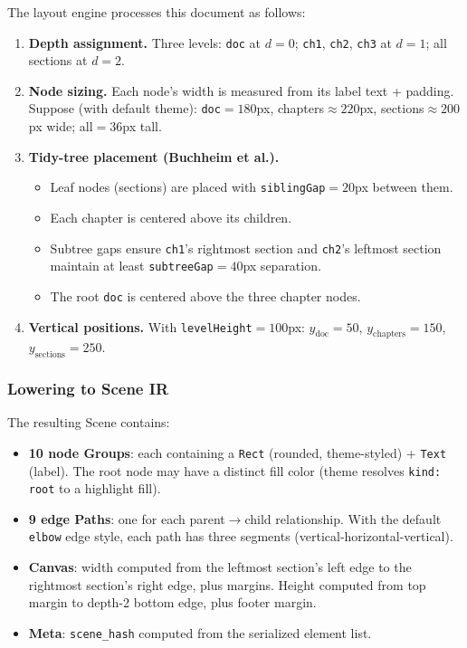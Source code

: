 The layout engine processes this document as follows:

\begin{enumerate}
  \item \textbf{Depth assignment.} Three levels: \texttt{doc} at $d=0$; \texttt{ch1}, \texttt{ch2}, \texttt{ch3} at $d=1$; all sections at $d=2$.
  
  \item \textbf{Node sizing.} Each node's width is measured from its label text + padding. Suppose (with default theme): \texttt{doc}$=180$px, chapters$\approx220$px, sections$\approx200$px wide; all$=36$px tall.
  
  \item \textbf{Tidy-tree placement (Buchheim et al.).}
  \begin{itemize}
    \item Leaf nodes (sections) are placed with \texttt{siblingGap}$=20$px between them.
    \item Each chapter is centered above its children.
    \item Subtree gaps ensure \texttt{ch1}'s rightmost section and \texttt{ch2}'s leftmost section maintain at least \texttt{subtreeGap}$=40$px separation.
    \item The root \texttt{doc} is centered above the three chapter nodes.
  \end{itemize}
  
  \item \textbf{Vertical positions.} With \texttt{levelHeight}$=100$px: $y_{\text{doc}}=50$, $y_{\text{chapters}}=150$, $y_{\text{sections}}=250$.
\end{enumerate}

\subsubsection{Lowering to Scene IR}

The resulting Scene contains:

\begin{itemize}
  \item \textbf{10 node Groups}: each containing a \texttt{Rect} (rounded, theme-styled) + \texttt{Text} (label). The root node may have a distinct fill color (theme resolves \texttt{kind: root} to a highlight fill).
  
  \item \textbf{9 edge Paths}: one for each parent$\rightarrow$child relationship. With the default \texttt{elbow} edge style, each path has three segments (vertical-horizontal-vertical).
  
  \item \textbf{Canvas}: width computed from the leftmost section's left edge to the rightmost section's right edge, plus margins. Height computed from top margin to depth-2 bottom edge, plus footer margin.
  
  \item \textbf{Meta}: \texttt{scene\_hash} computed from the serialized element list.
\end{itemize}

